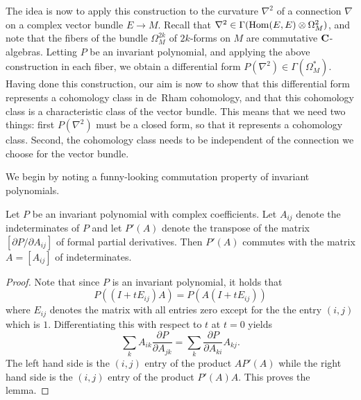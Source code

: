 \documentclass[a4paper,openany]{scrbook}
\begin{document}
The idea is now to apply this construction to the curvature $\nabla^2$ of a connection $\nabla$ on a complex vector bundle $E \to M$. Recall that $\nabla^2 \in \Gamma(\operatorname{Hom}(E, E) \otimes \Omega^2_M)$, and note that the fibers of the bundle $\Omega^{2k}_M$ of $2k$-forms on $M$ are commutative $\mathbf C$-algebras. Letting $P$ be an invariant polynomial, and applying the above construction in each fiber, we obtain a differential form $P(\nabla^2) \in \Gamma(\Omega^*_M)$. Having done this construction, our aim is now to show that this differential form represents a cohomology class in de~Rham cohomology, and that this cohomology class is a characteristic class of the vector bundle. This means that we need two things: first $P(\nabla^2)$ must be a closed form, so that it represents a cohomology class. Second, the cohomology class needs to be independent of the connection we choose for the vector bundle.

We begin by noting a funny-looking commutation property of invariant polynomials.

\begin{lemma}\label{lem:invariant polynomial commutation}
Let $P$ be an invariant polynomial with complex coefficients. Let $A_{ij}$ denote the indeterminates of $P$ and let $P'(A)$ denote the transpose of the matrix $[\partial P/\partial A_{ij}]$ of formal partial derivatives. Then $P'(A)$ commutes with the matrix $A = [A_{ij}]$ of indeterminates.
\begin{proof}
Note that since $P$ is an invariant polynomial, it holds that
\[P((I + tE_{ij})A) = P(A(I + tE_{ij}))\]
where $E_{ij}$ denotes the matrix with all entries zero except for the the entry $(i, j)$ which is $1$. Differentiating this with respect to $t$ at $t = 0$ yields
\[\sum_k A_{ik} \frac{\partial P}{\partial A_{jk}} = \sum_k \frac{\partial P}{\partial A_{ki}} A_{kj}.\]
The left hand side is the $(i, j)$ entry of the product $AP'(A)$ while the right hand side is the $(i, j)$ entry of the product $P'(A)A$. This proves the lemma.
\end{proof}
\end{lemma}
\end{document}
